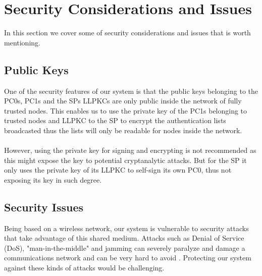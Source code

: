 \section{Security Considerations and Issues}
In this section we cover some of security considerations and issues that is worth mentioning. 

\subsection{Public Keys}
One of the security features of our system is that the public keys belonging to the PC0s, PC1s and the SPs LLPKCs are only public inside the network of fully trusted nodes. This enables us to use the private key of the PC1s belonging to trusted nodes and LLPKC to the SP to encrypt the authentication lists broadcasted thus the lists will only be readable for nodes inside the network. %
\\\\
However, using the private key for signing and encrypting is not recommended as this might expose the key to potential cryptanalytic attacks. But for the SP it only uses the private key of its LLPKC to self-sign its own PC0, thus not exposing its key in such degree.

\subsection{Security Issues}
Being based on a wireless network, our system is vulnerable to security attacks that take advantage of this shared medium. Attacks such as Denial of Service (DoS), "man-in-the-middle" and jamming can severely paralyze and damage a communications network and can be very hard to avoid \cite{1625756}. Protecting our system against these kinds of attacks would be challenging. 



